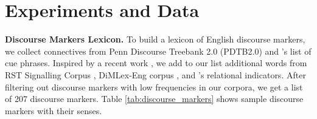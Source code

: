 \section{Experiments and Data}
\textbf{Discourse Markers Lexicon.}
To build a lexicon of English discourse markers, we collect connectives from Penn Discourse Treebank 2.0 (PDTB2.0) \cite{DBLP:conf/lrec/PrasadDLMRJW08} and \cite{marcu1998rhetorical}'s list of cue phrases. Inspired by a recent work \cite{DBLP:conf/sigdial/DasSBS18}, we add to our list additional words from RST Signalling Corpus \cite{das2014rst}, DiMLex-Eng corpus \cite{DBLP:conf/sigdial/DasSBS18}, and \cite{DBLP:journals/ijsc/BiranR11}'s relational indicators. After filtering out discourse markers with low frequencies in our corpora, we get a list of 207 discourse markers. Table \ref{tab:discourse_markers} shows sample discourse markers with their senses.%
